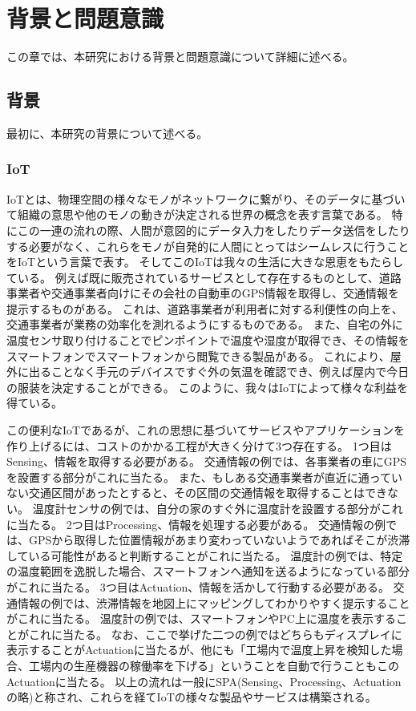 \chapter{背景と問題意識}
この章では、本研究における背景と問題意識について詳細に述べる。

\section{背景}
最初に、本研究の背景について述べる。

\subsection{IoT}
IoTとは、物理空間の様々なモノがネットワークに繋がり、そのデータに基づいて組織の意思や他のモノの動きが決定される世界の概念を表す言葉である。
特にこの一連の流れの際、人間が意図的にデータ入力をしたりデータ送信をしたりする必要がなく、これらをモノが自発的に人間にとってはシームレスに行うことをIoTという言葉で表す。
そしてこのIoTは我々の生活に大きな恩恵をもたらしている。
例えば既に販売されているサービスとして存在するものとして、道路事業者や交通事業者向けにその会社の自動車のGPS情報を取得し、交通情報を提示するものがある。\cite{hitachi_traffic}
これは、道路事業者が利用者に対する利便性の向上を、交通事業者が業務の効率化を測れるようにするものである。
また、自宅の外に温度センサ取り付けることでピンポイントで温度や湿度が取得でき、その情報をスマートフォンでスマートフォンから閲覧できる製品がある。\cite{therometer}
これにより、屋外に出ることなく手元のデバイスですぐ外の気温を確認でき、例えば屋内で今日の服装を決定することができる。
このように、我々はIoTによって様々な利益を得ている。

この便利なIoTであるが、これの思想に基づいてサービスやアプリケーションを作り上げるには、コストのかかる工程が大きく分けて3つ存在する。
1つ目はSensing、情報を取得する必要がある。
交通情報の例では、各事業者の車にGPSを設置する部分がこれに当たる。
また、もしある交通事業者が直近に通っていない交通区間があったとすると、その区間の交通情報を取得することはできない。
温度計センサの例では、自分の家のすぐ外に温度計を設置する部分がこれに当たる。
2つ目はProcessing、情報を処理する必要がある。
交通情報の例では、GPSから取得した位置情報があまり変わっていないようであればそこが渋滞している可能性があると判断することがこれに当たる。
温度計の例では、特定の温度範囲を逸脱した場合、スマートフォンへ通知を送るようになっている部分がこれに当たる。
3つ目はActuation、情報を活かして行動する必要がある。
交通情報の例では、渋滞情報を地図上にマッピングしてわかりやすく提示することがこれに当たる。
温度計の例では、スマートフォンやPC上に温度を表示することがこれに当たる。
なお、ここで挙げた二つの例ではどちらもディスプレイに表示することがActuationに当たるが、他にも「工場内で温度上昇を検知した場合、工場内の生産機器の稼働率を下げる」ということを自動で行うこともこのActuationに当たる。
以上の流れは一般にSPA(Sensing、Processing、Actuationの略)と称され、これらを経てIoTの様々な製品やサービスは構築される。

